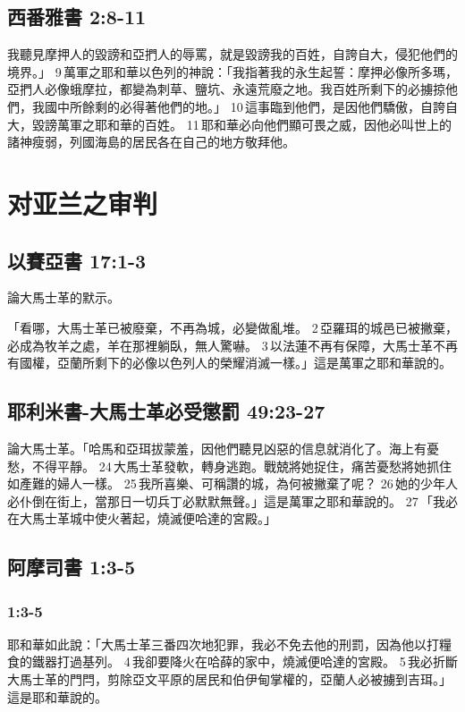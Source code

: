 \subsection{西番雅書 2:8-11}
我聽見摩押人的毀謗和亞捫人的辱罵，就是毀謗我的百姓，自誇自大，侵犯他們的境界。」 9 萬軍之耶和華以色列的神說：「我指著我的永生起誓：摩押必像所多瑪，亞捫人必像蛾摩拉，都變為刺草、鹽坑、永遠荒廢之地。我百姓所剩下的必擄掠他們，我國中所餘剩的必得著他們的地。」 10 這事臨到他們，是因他們驕傲，自誇自大，毀謗萬軍之耶和華的百姓。 11 耶和華必向他們顯可畏之威，因他必叫世上的諸神瘦弱，列國海島的居民各在自己的地方敬拜他。










\section{对亚兰之审判}
\subsection{以賽亞書 17:1-3}
論大馬士革的默示。

「看哪，大馬士革已被廢棄，不再為城，必變做亂堆。 2 亞羅珥的城邑已被撇棄，必成為牧羊之處，羊在那裡躺臥，無人驚嚇。 3 以法蓮不再有保障，大馬士革不再有國權，亞蘭所剩下的必像以色列人的榮耀消滅一樣。」這是萬軍之耶和華說的。

\subsection{耶利米書-大馬士革必受懲罰 49:23-27}
論大馬士革。「哈馬和亞珥拔蒙羞，因他們聽見凶惡的信息就消化了。海上有憂愁，不得平靜。 24 大馬士革發軟，轉身逃跑。戰兢將她捉住，痛苦憂愁將她抓住如產難的婦人一樣。 25 我所喜樂、可稱讚的城，為何被撇棄了呢？ 26 她的少年人必仆倒在街上，當那日一切兵丁必默默無聲。」這是萬軍之耶和華說的。 27 「我必在大馬士革城中使火著起，燒滅便哈達的宮殿。」

\subsection{阿摩司書 1:3-5}
\subsubsection{1:3-5}
耶和華如此說：「大馬士革三番四次地犯罪，我必不免去他的刑罰，因為他以打糧食的鐵器打過基列。 4 我卻要降火在哈薛的家中，燒滅便哈達的宮殿。 5 我必折斷大馬士革的門閂，剪除亞文平原的居民和伯伊甸掌權的，亞蘭人必被擄到吉珥。」這是耶和華說的。

